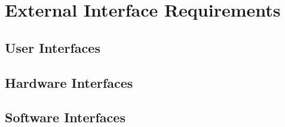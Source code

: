 \documentclass{scrreprt}
\begin{document}
\chapter{External Interface Requirements}

\section{User Interfaces}
\begin{comment}$<$Describe the logical characteristics of each interface between the software 
product and the users. This may include sample screen images, any GUI standards 
or product family style guides that are to be followed, screen layout 
constraints, standard buttons and functions (e.g., help) that will appear on 
every screen, keyboard shortcuts, error message display standards, and so on.  
Define the software components for which a user interface is needed. Details of 
the user interface design should be documented in a separate user interface 
specification.$>$
\end{comment}

\section{Hardware Interfaces}
\begin{comment}$<$Describe the logical and physical characteristics of each interface between 
the software product and the hardware components of the system. This may include 
the supported device types, the nature of the data and control interactions 
between the software and the hardware, and communication protocols to be 
used.$>$
\end{comment}

\section{Software Interfaces}
\begin{comment}$<$Describe the connections between this product and other specific software 
components (name and version), including databases, operating systems, tools, 
libraries, and integrated commercial components. Identify the data items or 
messages coming into the system and going out and describe the purpose of each.  
Describe the services needed and the nature of communications. Refer to 
documents that describe detailed application programming interface protocols.  
Identify data that will be shared across software components. If the data 
sharing mechanism must be implemented in a specific way (for example, use of a 
global data area in a multitasking operating system), specify this as an 
implementation constraint.$>$
\end{comment}
\end{document}
